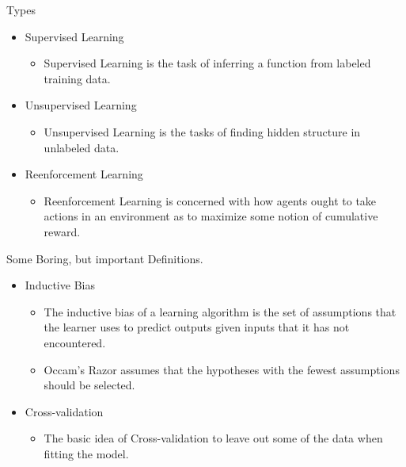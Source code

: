 \begin{frame}{Types}

\begin{itemize}
\itemsep1pt\parskip0pt
\item
  Supervised Learning

  \begin{itemize}
  \itemsep1pt\parskip0pt
  \item
    Supervised Learning is the task of inferring a function from labeled
    training data.
  \end{itemize}
\item
  Unsupervised Learning

  \begin{itemize}
  \itemsep1pt\parskip0pt
  \item
    Unsupervised Learning is the tasks of finding hidden structure in
    unlabeled data.
  \end{itemize}
\item
  Reenforcement Learning

  \begin{itemize}
  \itemsep1pt\parskip0pt
  \item
    Reenforcement Learning is concerned with how agents ought to take
    actions in an environment as to maximize some notion of cumulative
    reward.
  \end{itemize}
\end{itemize}

\end{frame}

\begin{frame}{Some Boring, but important Definitions.}

\begin{itemize}
\itemsep1pt\parskip0pt
\item
  Inductive Bias

  \begin{itemize}
  \itemsep1pt\parskip0pt
  \item
    The inductive bias of a learning algorithm is the set of assumptions
    that the learner uses to predict outputs given inputs that it has
    not encountered.
  \item
    Occam's Razor assumes that the hypotheses with the fewest
    assumptions should be selected.
  \end{itemize}
\item
  Cross-validation

  \begin{itemize}
  \itemsep1pt\parskip0pt
  \item
    The basic idea of Cross-validation to leave out some of the data
    when fitting the model.
  \end{itemize}
\end{itemize}

\end{frame}

